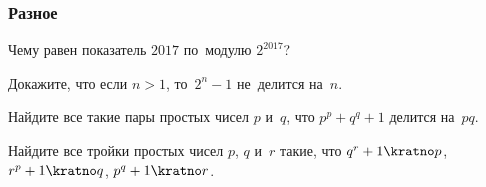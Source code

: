 \subsubsection*{Разное}

\begin{problems}

\item
Чему равен показатель $2017$ по~модулю $2^{2017}$?

\item
Докажите, что если $n > 1$, то~$2^{n} - 1$ не~делится на~$n$.

\item
Найдите все такие пары простых чисел $p$ и~$q$, что $p^{p} + q^{q} + 1$ делится
на~$p q$.

\item
Найдите все тройки простых чисел $p$, $q$ и~$r$ такие, что
$q^r + 1 \kratno p$, $r^p + 1 \kratno q$, $p^q + 1 \kratno r$.


\end{problems}

\endgroup %

